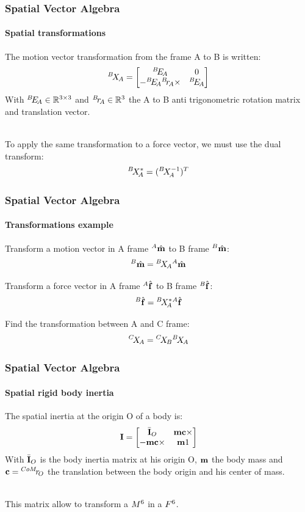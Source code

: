 \documentclass{beamer}
\begin{document}
  	\begin{frame}
		\frametitle{Spatial Vector Algebra}
		\framesubtitle{Spatial transformations}
		The motion vector transformation from the frame A to B is written:
		$$
		\transform{A}{B} = \begin{bmatrix} \rotation{A}{B} & 0 \\ -\rotation{A}{B} \translation{A}{B} \times & \rotation{A}{B} \end{bmatrix}
		$$
		With $ \rotation{A}{B} \in \mathbb{R}^{3{\times}3} $ and $ \translation{A}{B} \in \mathbb{R}^{3} $ the A to B anti trigonometric rotation matrix and translation vector.

		\hfill \\
		To apply the same transformation to a force vector, we must use the dual transform:
		$$
		\transformDual{A}{B} = (\transformInv{A}{B})^T
		$$
	\end{frame}


  	\begin{frame}
		\frametitle{Spatial Vector Algebra}
		\framesubtitle{Transformations example}
		Transform a motion vector in A frame $ \motionvecHatFrame{A} $ to B frame $ \motionvecHatFrame{B} $:
		$$
		\motionvecHatFrame{B} = \transform{A}{B} \motionvecHatFrame{A}
		$$

		Transform a force vector in A frame $ \forcevecHatFrame{A} $ to B frame $ \forcevecHatFrame{B} $:
		$$
		\forcevecHatFrame{B} = \transformDual{A}{B} \forcevecHatFrame{A}
		$$

		Find the transformation between A and C frame:
		$$
		\transform{A}{C} = \transform{B}{C}\transform{A}{B}
		$$
	\end{frame}


  	\begin{frame}
		\frametitle{Spatial Vector Algebra}
		\framesubtitle{Spatial rigid body inertia}
		The spatial inertia at the origin O of a body is:
		$$
		\inertia = \begin{bmatrix} \inertiaBarOrigin{O} & \mass \bodycom \times \\ -\mass \bodycom \times & \mass1 \end{bmatrix}
		$$
		With $ \inertiaBarOrigin{O} $ is the body inertia matrix at his origin O, $ \mass $ the body mass and $ \bodycom = \translation{O}{{CoM}} $ the translation between the body origin and his center of mass.

		\hfill \\
		This matrix allow to transform a $ \motionspace{6} $ in a $ \forcespace{6} $.
	\end{frame}
\end{document}
